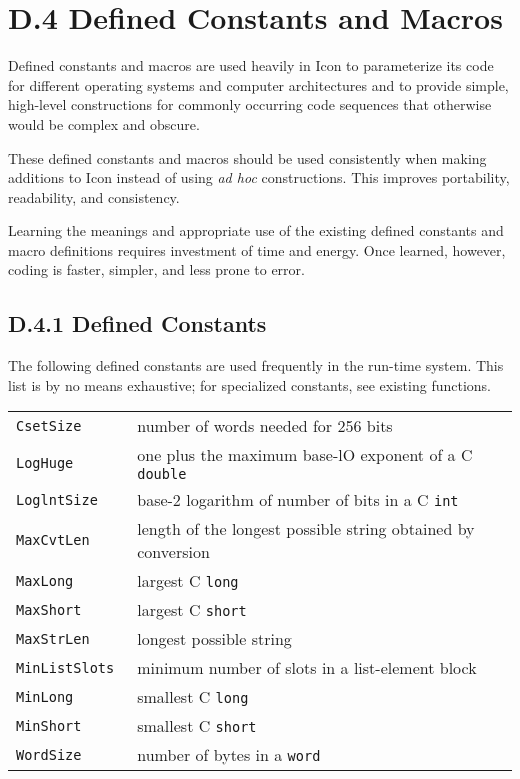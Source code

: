 \section[D.4 Defined Constants and Macros]{D.4 Defined Constants and Macros}

Defined constants and macros are used heavily in Icon to parameterize
its code for different operating systems and computer architectures
and to provide simple, high-level constructions for commonly occurring
code sequences that otherwise would be complex and obscure.

These defined constants and macros should be used consistently when
making additions to Icon instead of using \textit{ad hoc}
constructions. This improves portability, readability, and
consistency.

Learning the meanings and appropriate use of the existing defined
constants and macro definitions requires investment of time and
energy. Once learned, however, coding is faster, simpler, and less
prone to error.

\subsection[D.4.1 Defined Constants]{D.4.1 Defined Constants}

The following defined constants are used frequently in the run-time
system. This list is by no means exhaustive; for specialized
constants, see existing functions.\\[1ex]

{\renewcommand{\arraystretch}{0.9}%
\begin{xtabular}{>{\hspace{1cm}\texttt\bgroup}l<{\egroup}@{\hspace{1cm}}p{11cm}}
CsetSize     & number of words needed for 256 bits\\
LogHuge      & one plus the maximum base-lO exponent of a C \texttt{double}\\
LoglntSize   & base-2 logarithm of number of bits in a C \texttt{int}\\
MaxCvtLen    & length of the longest possible string obtained by conversion\\
MaxLong      & largest C \texttt{long}\\
MaxShort     & largest C \texttt{short}\\
MaxStrLen    & longest possible string\\
MinListSlots & minimum number of slots in a list-element block\\
MinLong      & smallest C \texttt{long}\\
MinShort     & smallest C \texttt{short}\\
WordSize     & number of bytes in a \texttt{word}\\
\end{xtabular}
}\\[1ex]

